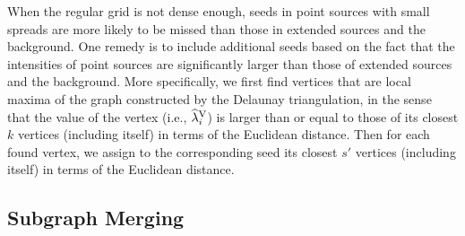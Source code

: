 \documentclass{aastex61}
\begin{document}
When the regular grid is not dense enough, seeds in point sources with small spreads are more likely to be missed than those in extended sources and the background. One remedy is to include additional seeds based on the fact that the intensities of point sources are significantly larger than those of extended sources and the background. More specifically, we first find vertices that are local maxima of the graph constructed by the Delaunay triangulation, in the sense that the value of the vertex (i.e., $\widehat{\lambda}_i^{\rm V}$) is larger than or equal to those of its closest $k$ vertices (including itself) in terms of the Euclidean distance. Then for each found vertex, we assign to the corresponding seed its closest $s'$  vertices (including itself) in terms of the Euclidean distance.

\subsection{Subgraph Merging}

\newpage




\end{document}
